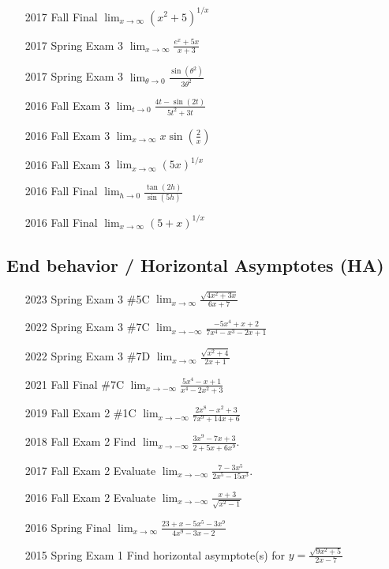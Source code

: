 \documentclass[10pt]{scrartcl}
\theoremstyle{definition}
\begin{document}
\begin{enumerate}
\item [2017 Fall Final] $\lim_{x\to\infty} (x^2+5)^{1/x}$
\item [2017 Spring Exam 3] $\lim_{x\to\infty} \frac{e^x + 5x}{x + 3}$
\item [2017 Spring Exam 3] $\lim_{\theta\to0} \frac{\sin(\theta^2)}{3\theta^2}$
\item [2016 Fall Exam 3] $\lim_{t\to 0} \frac{4t-\sin(2t)}{5t^2 + 3t}$
\item [2016 Fall Exam 3] $\lim_{x\to\infty} x \sin(\frac 2x)$
\item [2016 Fall Exam 3] $\lim_{x\to\infty} (5x)^{1/x}$
\item [2016 Fall Final] $\lim_{h\to 0}\frac{\tan(2h)}{\sin(5h)}$
\item [2016 Fall Final] $\lim_{x\to\infty} (5+x)^{1/x}$
\end{enumerate}

\subsection{End behavior / Horizontal Asymptotes (HA)}
\begin{enumerate}
\item[2023 Spring Exam 3 \#5C] $\lim_{x\to\infty} \frac{\sqrt{4x^2+3x}}{6x+7}$
\item[2022 Spring Exam 3 \#7C] $\lim_{x\to-\infty} \frac{-5x^4+x+2}{7x^4-x^3-2x+1}$
\item[2022 Spring Exam 3 \#7D] $\lim_{x\to\infty} \frac{\sqrt{x^2+4}}{2x+1}$
\item[2021 Fall Final \#7C] $\lim_{x\to-\infty} \frac{5x^4-x+1}{x^4-2x^2+3}$
\item [2019 Fall Exam 2 \#1C] $\lim_{x\to-\infty} \frac{2x^8-x^2+3}{7x^9+14x+6}$
\item [2018 Fall Exam 2] Find $\lim_{x\to-\infty} \frac{3x^9 - 7x + 3}{2 + 5x + 6x^9}$.
\item [2017 Fall Exam 2] Evaluate $\lim_{x\to-\infty} \frac{7-3x^5}{2x^5-15x^3}$.
\item [2016 Fall Exam 2] Evaluate $\lim_{x\to-\infty} \frac{x+3}{\sqrt{x^2-1}}$
\item [2016 Spring Final] $\lim_{x\to\infty} \frac{23 + x - 5x^5 - 3x^9}{4x^9 - 3x - 2}$
\item [2015 Spring Exam 1] Find horizontal asymptote(s) for $y = \frac{\sqrt{9x^2+5}}{2x-7}$
\end{enumerate}
\end{document}
